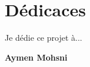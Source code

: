 \chapter*{Dédicaces }

\begin{center}

\begin{minipage}[c]{1\columnwidth}

{\large 
\vskip1cm

\centering
Je dédie ce projet à...
}


\end{minipage}

\end{center}

\vskip1.5cm
\begin{flushright}\LARGE
\bf{Aymen Mohsni}
\end{flushright}







